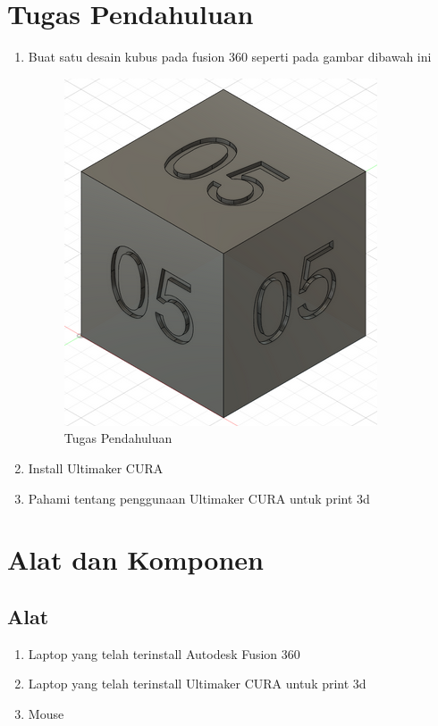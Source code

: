 \section{Tugas Pendahuluan}
\begin{enumerate}
    \item Buat satu desain kubus pada fusion 360 seperti pada gambar dibawah ini
        \begin{figure}[H]
            \centering
            \includegraphics[width=0.5\linewidth]{P3/img/soal1.png}
            \caption{Tugas Pendahuluan}
            \label{fig:Tugas Pendahuluan}
        \end{figure}
    
    \item Install Ultimaker CURA
    \item Pahami tentang penggunaan Ultimaker CURA untuk print 3d
\end{enumerate}

\section{Alat dan Komponen}
\subsection{Alat}
\begin{enumerate}
    \item Laptop yang telah terinstall Autodesk Fusion 360
    \item Laptop yang telah terinstall Ultimaker CURA untuk print 3d
    \item Mouse
\end{enumerate}

